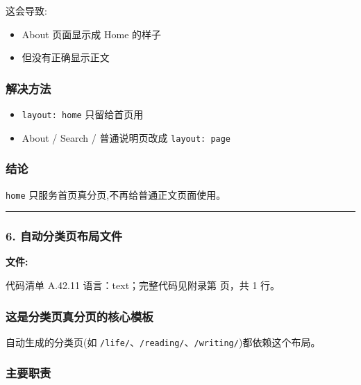\documentclass[lang=cn,scheme=chinese,color=blue,device=normal,toc=onecol,math=cm]{elegantbook}
\begin{document}
这会导致:\par


\begin{itemize}
\item About 页面显示成 Home 的样子
\item 但没有正确显示正文
\end{itemize}


\subsubsection{解决方法}


\begin{itemize}
\item \texttt{layout: home} 只留给首页用
\item About /\allowbreak{} Search /\allowbreak{} 普通说明页改成 \texttt{layout: page}
\end{itemize}


\subsubsection{结论}


\texttt{home} 只服务首页真分页,不再给普通正文页面使用。\par


\medskip\hrule\medskip


\subsubsection{6. 自动分类页布局文件}


\textbf{文件:}\par


\begin{codeindexbox}{代码清单 A.42.11}
语言：text；完整代码见附录第 \pageref{code:42:11} 页，共 1 行。
\end{codeindexbox}


\subsubsection{这是分类页真分页的核心模板}


自动生成的分类页(如 \texttt{/\allowbreak{}life/\allowbreak{}}、\texttt{/\allowbreak{}reading/\allowbreak{}}、\texttt{/\allowbreak{}writing/\allowbreak{}})都依赖这个布局。\par


\subsubsection{主要职责}
\end{document}

